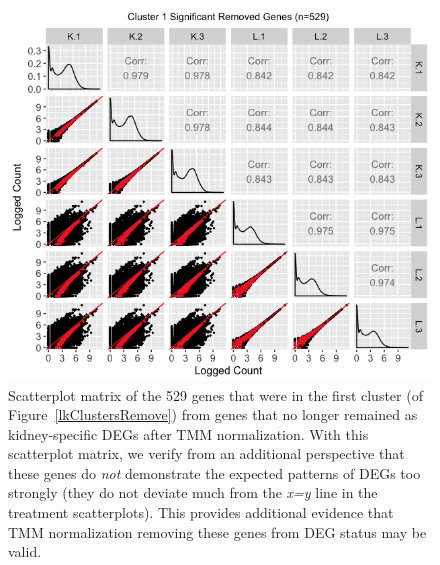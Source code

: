 \documentclass{article}
\begin{document}
  \null
  \begin{figure}[t!]
  \centerline{\includegraphics[width=1\columnwidth]{../MakeFigures/lkClustersRemoveSM.jpg}}
  \caption{Scatterplot matrix of the 529 genes that were in the first cluster (of Figure~\ref{lkClustersRemove}) from genes that no longer remained as kidney-specific DEGs after TMM normalization. With this scatterplot matrix, we verify from an additional perspective that these genes do \textit{not} demonstrate the expected patterns of DEGs too strongly (they do not deviate much from the \textit{x=y} line in the treatment scatterplots). This provides additional evidence that TMM normalization removing these genes from DEG status may be valid.
  \label{lkClustersRemoveSM}}
  \end{figure}
  
\end{document}
